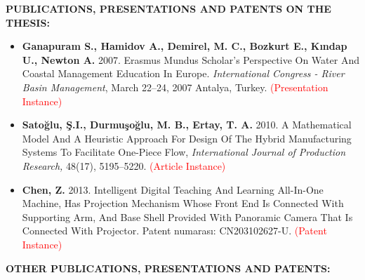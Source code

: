 \textbf{PUBLICATIONS, PRESENTATIONS AND PATENTS ON THE THESIS:} 
\vspace{-3mm}
\begin{itemize}[leftmargin=0.7cm,itemsep=0.5em,labelsep=5mm] %
	\item \textbf{Ganapuram S., Hamidov A., Demirel, M. C., Bozkurt E., Kındap U., Newton A.} %
	2007. Erasmus Mundus Scholar's Perspective On Water And Coastal
	Management Education In Europe. 
	\textit{International Congress - River Basin Management}, 
	March 22--24, 2007 Antalya, Turkey. \textcolor{red}{(Presentation Instance)}
	
	\item \textbf{Satoğlu, Ş.I., Durmuşoğlu, M. B., Ertay, T. A.} 2010. A Mathematical Model  %
	And A Heuristic Approach For Design Of The Hybrid Manufacturing Systems 
	To Facilitate One-Piece Flow, 
	\textit{International Journal of Production Research,}
	48(17), 5195--5220. \textcolor{red}{(Article Instance)}
	
	\item  \textbf{Chen, Z.} 2013. Intelligent Digital Teaching And Learning All-In-One Machine, %
	Has Projection Mechanism Whose Front End Is Connected With Supporting
	Arm, And Base Shell Provided With Panoramic Camera That Is Connected With
	Projector. Patent numarası: CN203102627-U. \textcolor{red}{(Patent Instance)}
\end{itemize}


\textbf{OTHER PUBLICATIONS, PRESENTATIONS AND PATENTS:} 
\vspace{-3mm}


